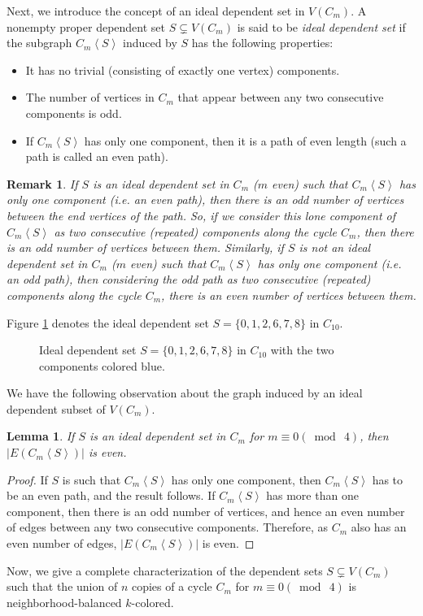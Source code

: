 \documentclass[12pt]{article}
\newtheorem{lemma}[theorem]{Lemma}
\newtheorem{remark}[theorem]{Remark}
\newcommand{\nbcd}{neighborhood-balanced $k$-colored\xspace}
\begin{document}
Next, we introduce the concept of an ideal dependent set in $V(C_m)$.
A nonempty proper dependent set $S \subsetneq V(C_m)$ is said to be {\it ideal dependent set} if the subgraph $C_m\left< S \right>$ induced by $S$ has the following properties:
\begin{itemize}
\setlength\itemsep{0pt}
    \item[i.] It has no trivial (consisting of exactly one vertex) components.
    \item[ii.] The number of vertices in $C_m$ that appear between any two consecutive components is odd.
    \item[iii.] If $C_m\left< S \right>$ has only one component, then it is a path of even length (such a path is called an even path).
\end{itemize}
\begin{remark}\label{remark on components}
    If $S$ is an ideal dependent set in $C_m$ ($m$ even) such that $C_m\left<S\right>$ has only one component (i.e. an even path), then there is an odd number of vertices between the end vertices of the path. So, if we consider this lone component of $C_m\left<S\right>$ as two consecutive (repeated) components along the cycle $C_m$, then there is an odd number of vertices between them. Similarly, if $S$ is not an ideal dependent set in $C_m$ ($m$ even) such that $C_m\left<S\right>$ has only one component (i.e. an odd path), then considering the odd path as two consecutive (repeated) components along the cycle $C_m$, there is an even number of vertices between them.
\end{remark}
Figure \ref{fig:segments} denotes the ideal dependent set $S= \{0,1,2,6,7,8\}$ in $C_{10}$.
\begin{figure}
    \centering
    
    \caption{Ideal dependent set $S = \{0,1,2,6,7,8\}$ in $C_{10}$ with the two components colored blue.}
    \label{fig:segments}
\end{figure}
We have the following observation about the graph induced by an ideal dependent subset of $V(C_m)$.

\begin{lemma}
    If $S$ is an ideal dependent set in $C_m$ for $m\equiv 0 (\bmod\ 4)$, then $|E(C_m\left< S \right>)|$ is even.
\end{lemma}
\begin{proof}
    If $S$ is such that $C_m\left< S \right>$ has only one component, then $C_m\left< S \right>$ has to be an even path, and the result follows.
    If $C_m\left< S \right>$ has more than one component, then there is an odd number of vertices, and hence an even number of edges between any two consecutive components.
    Therefore, as $C_m$ also has an even number of edges, $|E(C_m\left< S \right>)|$ is even.
\end{proof}
Now, we give a complete characterization of the dependent sets $S \subsetneq V(C_m)$ such that the union of $n$ copies of a cycle $C_m$ for $m \equiv 0 (\bmod\ 4)$ is \nbcd.
\end{document}
